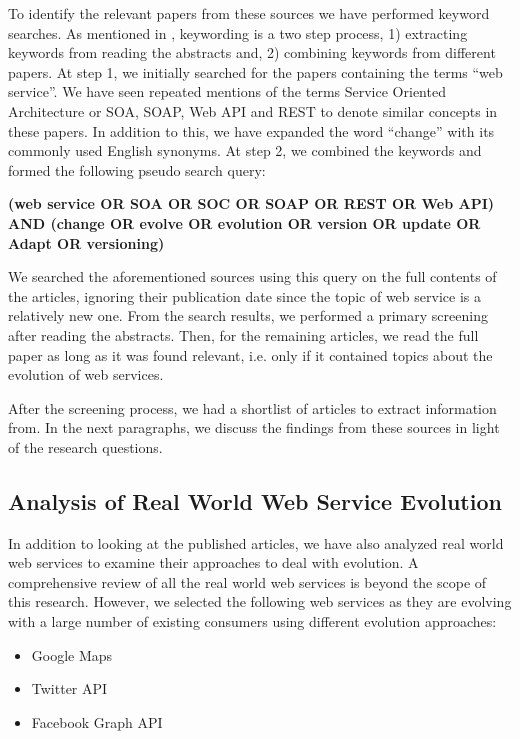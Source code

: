 \documentclass[runningheads,a4paper]{llncs}
\begin{document}
To identify the relevant papers from these sources we have performed keyword searches. As mentioned in \cite{petersen2008systematic}, keywording is a two step process, 1) extracting keywords from reading the abstracts and, 2) combining keywords from different papers. At step 1, we initially searched for the papers containing the terms ``web service''. We have seen repeated mentions of the terms Service Oriented Architecture or SOA, SOAP, Web API and REST to denote similar concepts in these papers. In addition to this, we have expanded the word ``change'' with its commonly used English synonyms. At step 2, we combined the keywords and formed the following pseudo search query:

\textbf{(web service OR SOA OR SOC OR SOAP OR REST OR Web API)  AND (change OR evolve OR evolution OR version OR update OR Adapt OR versioning)}

We searched the aforementioned sources using this query on the full contents of the articles, ignoring their publication date since the topic of web service is a relatively new one. From the search results, we performed a primary screening after reading the abstracts. Then, for the remaining articles, we read the full paper as long as it was found relevant, i.e. only if it contained topics about the evolution of web services.

After the screening process, we had a shortlist of articles to extract information from. In the next paragraphs, we discuss the findings from these sources in light of the research questions.

\subsection{Analysis of Real World Web Service Evolution} %
\label{sub:analysis_of_real_world_web_service_evolution}
In addition to looking at the published articles, we have also analyzed real world web services to examine their approaches to deal with evolution. A comprehensive review of all the real world web services is beyond the scope of this research. However, we selected the following web services as they are evolving with a large number of existing consumers using different evolution approaches:

\begin{itemize}
  \item Google Maps
  \item Twitter API
  \item Facebook Graph API
\end{itemize}
\end{document}

